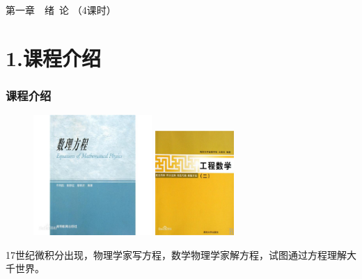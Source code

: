 	\begin{frame}
		\frametitle{}
		\Background[1] 
	    \begin{center}
		{ {\Huge 第一章~~绪~论 （4课时）}}
	    \end{center}    
		\addtocounter{framenumber}{-1} 		
	\end{frame}


\section{1.课程介绍}

\begin{frame}
\frametitle{课程介绍}
	\begin{center}
		\begin{figure}
		\begin{minipage}[t]{0.4\textwidth}
			\includegraphics[width=4.5cm]{figs/fig1-2.png}	
		\end{minipage}
		\begin{minipage}[t]{0.4\textwidth}
			\includegraphics[width=3.0cm]{figs/fig1-2-2.png}	
		\end{minipage}
		\end{figure}
	17世纪微积分出现，物理学家写方程，数学物理学家解方程，试图通过方程理解大千世界。
  	\end{center}
\end{frame}

